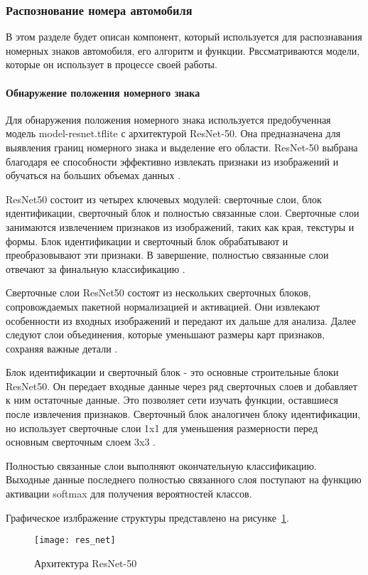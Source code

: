 \subsubsection{Распознование номера автомобиля}

В этом разделе будет описан компонент, который используется для распознавания номерных знаков автомобиля, его алгоритм и функции. Рвссматриваются модели, которые он использует в процессе своей работы.

\paragraph{Обнаружение положения номерного знака}
Для обнаружения положения номерного знака используется предобученная модель model-resnet.tflite с архитектурой ResNet-50. Она предназначена для выявления границ номерного знака и выделение его области. ResNet-50 выбрана благодаря ее способности эффективно извлекать признаки из изображений и обучаться на больших объемах данных . 

ResNet50 состоит из четырех ключевых модулей: сверточные слои, блок идентификации, сверточный блок и полностью связанные слои. Сверточные слои занимаются извлечением признаков из изображений, таких как края, текстуры и формы. Блок идентификации и сверточный блок обрабатывают и преобразовывают эти признаки. В завершение, полностью связанные слои отвечают за финальную классификацию .

Сверточные слои ResNet50 состоят из нескольких сверточных блоков, сопровождаемых пакетной нормализацией и активацией. Они извлекают особенности из входных изображений и передают их дальше для анализа. Далее следуют слои объединения, которые уменьшают размеры карт признаков, сохраняя важные детали .

Блок идентификации и сверточный блок - это основные строительные блоки ResNet50. Он передает входные данные через ряд сверточных слоев и добавляет к ним остаточные данные. Это позволяет сети изучать функции, оставшиеся после извлечения признаков. Сверточный блок аналогичен блоку идентификации, но использует сверточные слои 1x1 для уменьшения размерности перед основным сверточным слоем 3x3 .

Полностью связанные слои выполняют окончательную классификацию. Выходные данные последнего полностью связанного слоя поступают на функцию активации softmax для получения вероятностей классов.

Графическое излбражение структуры представлено на рисунке~\ref{f:res_net}.
\begin{figure}[ht]
	\centering
	\vspace{\toppaddingoffigure}
	\texttt{[image: res\_net]}
	\caption{Архитектура ResNet-50}
	\label{f:res_net}
\end{figure}




